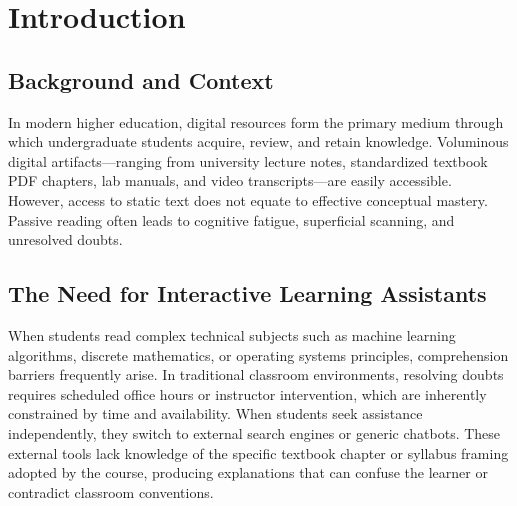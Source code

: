 \documentclass[11pt,a4paper]{report}
\begin{document}
\chapter{Introduction}
\label{ch:intro}

\section{Background and Context}
In modern higher education, digital resources form the primary medium through which undergraduate students acquire, review, and retain knowledge. Voluminous digital artifacts---ranging from university lecture notes, standardized textbook PDF chapters, lab manuals, and video transcripts---are easily accessible. However, access to static text does not equate to effective conceptual mastery. Passive reading often leads to cognitive fatigue, superficial scanning, and unresolved doubts.

\section{The Need for Interactive Learning Assistants}
When students read complex technical subjects such as machine learning algorithms, discrete mathematics, or operating systems principles, comprehension barriers frequently arise. In traditional classroom environments, resolving doubts requires scheduled office hours or instructor intervention, which are inherently constrained by time and availability. When students seek assistance independently, they switch to external search engines or generic chatbots. These external tools lack knowledge of the specific textbook chapter or syllabus framing adopted by the course, producing explanations that can confuse the learner or contradict classroom conventions.
\end{document}
